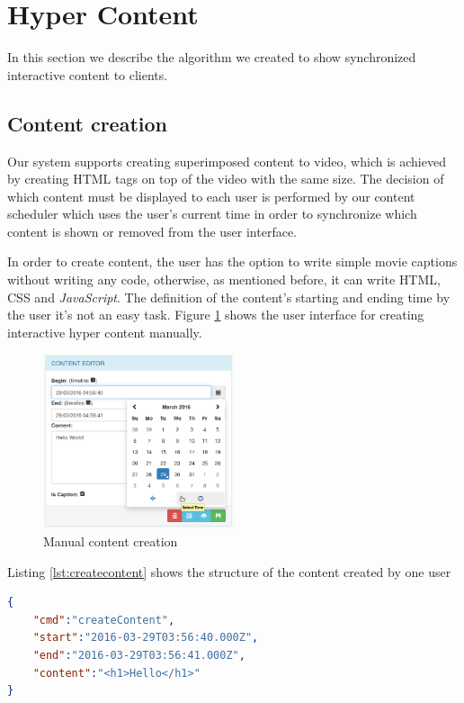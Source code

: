 \section{Hyper Content}
	In this section we describe the algorithm we created to show synchronized interactive content to clients.


	\subsection{Content creation}

	Our system supports creating superimposed content to video, which is achieved by creating \ac{HTML} tags on top of the video  with the same size. The decision of which content must be displayed to each user is performed by our content scheduler which uses the user's current time in order to synchronize which content is shown or removed from the user interface.

	In order to create content, the user has the option to write simple movie captions without writing any code, otherwise, as mentioned before, it can write \ac{HTML}, \ac{CSS} and \emph{JavaScript}. The definition of the content's starting and ending time by the user it's not an easy task. 
	Figure \ref{fig:creation} shows the user interface for creating interactive hyper content manually.

	\begin{figure}[H]
		\centering
		\includegraphics[width=0.5\textwidth]{figures/edition.png}
		\caption{Manual content creation}
		\label{fig:creation}
	\end{figure}

	Listing \ref{lst:createcontent} shows the structure of the content created by one user%

\begin{minipage}{\linewidth}
\begin{lstlisting}[caption={Example of content created by one user},label={lst:createcontent},language=json]
{
	"cmd":"createContent",
	"start":"2016-03-29T03:56:40.000Z",
	"end":"2016-03-29T03:56:41.000Z",
	"content":"<h1>Hello</h1>"
}
\end{lstlisting}
\end{minipage}


